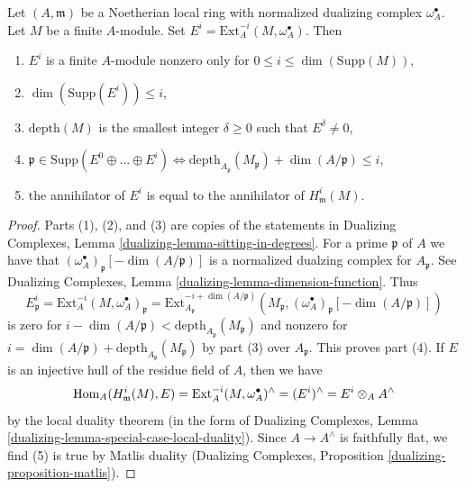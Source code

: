 \begin{lemma}
\label{lemma-sitting-in-degrees}
Let $(A, \mathfrak m)$ be a Noetherian local ring with
normalized dualizing complex $\omega_A^\bullet$.
Let $M$ be a finite $A$-module.
Set $E^i = \text{Ext}_A^{-i}(M, \omega_A^\bullet)$.
Then
\begin{enumerate}
\item $E^i$ is a finite $A$-module nonzero only for
$0 \leq i \leq \dim(\text{Supp}(M))$,
\item $\dim(\text{Supp}(E^i)) \leq i$,
\item $\text{depth}(M)$ is the smallest integer $\delta \geq 0$ such that
$E^\delta \not = 0$,
\item $\mathfrak p \in \text{Supp}(E^0 \oplus \ldots \oplus E^i)
\Leftrightarrow
\text{depth}_{A_\mathfrak p}(M_\mathfrak p) + \dim(A/\mathfrak p) \leq i$,
\item the annihilator of $E^i$ is equal to the annihilator
of $H^i_\mathfrak m(M)$.
\end{enumerate}
\end{lemma}

\begin{proof}
Parts (1), (2), and (3) are copies of the statements in
Dualizing Complexes, Lemma \ref{dualizing-lemma-sitting-in-degrees}.
For a prime $\mathfrak p$ of $A$ we have that
$(\omega_A^\bullet)_\mathfrak p[-\dim(A/\mathfrak p)]$
is a normalized dualzing complex for $A_\mathfrak p$.
See Dualizing Complexes, Lemma \ref{dualizing-lemma-dimension-function}.
Thus
$$
E^i_\mathfrak p =
\text{Ext}^{-i}_A(M, \omega_A^\bullet)_\mathfrak p =
\text{Ext}^{-i + \dim(A/\mathfrak p)}_{A_\mathfrak p}
(M_\mathfrak p, (\omega_A^\bullet)_\mathfrak p[-\dim(A/\mathfrak p)])
$$
is zero for
$i - \dim(A/\mathfrak p) < \text{depth}_{A_\mathfrak p}(M_\mathfrak p)$
and nonzero for
$i = \dim(A/\mathfrak p) + \text{depth}_{A_\mathfrak p}(M_\mathfrak p)$
by part (3) over $A_\mathfrak p$.
This proves part (4).
If $E$ is an injective hull of the residue field of $A$, then we have
$$
\mathop{\mathrm{Hom}}\nolimits_A(H^i_\mathfrak m(M), E) =
\text{Ext}^{-i}_A(M, \omega_A^\bullet)^\wedge =
(E^i)^\wedge =
E^i \otimes_A A^\wedge
$$
by the local duality theorem (in the form of
Dualizing Complexes, Lemma \ref{dualizing-lemma-special-case-local-duality}).
Since $A \to A^\wedge$ is faithfully flat, we find (5) is true by
Matlis duality
(Dualizing Complexes, Proposition \ref{dualizing-proposition-matlis}).
\end{proof}






